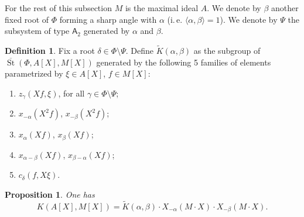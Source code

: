 \documentclass[10pt,a4paper,twoside]{article}
\newtheorem{prop}[lemma]{Proposition}
\theoremstyle{remark}
\theoremstyle{definition}
\numberwithin{lemma}{section}
\numberwithin{prop}{section}
\numberwithin{corollary}{section}
\numberwithin{externaltheorem}{section}
\newtheorem{df}[lemma]{Definition} \Crefname{df}{Definition}{Definitions}
\DeclareMathOperator{\St}{St}
\newcommand{\rA}{\mathsf{A}}
\numberwithin{equation}{section}
\begin{document}
For the rest of this subsection $M$ is the maximal ideal $A$.
We denote by $\beta$ another fixed root of $\Phi$ forming a sharp angle with $\alpha$ (i.\,e. $\langle \alpha, \beta \rangle = 1$). We denote by $\Psi$ the subsystem of type $\rA_2$ generated by $\alpha$ and $\beta$.
\begin{df}\label{def:Kab} 
Fix a root $\delta \in \Phi \setminus \Psi$. Define $\widetilde{K}(\alpha, \beta)$ as the subgroup of $\overline{\St}(\Phi, A[X], M[X])$ generated by the following 5 families of elements parametrized by $\xi \in A[X]$, $f\in M[X]$:
 \begin{enumerate}[label=(K\arabic*)]
  \item $z_\gamma(Xf, \xi)$, for all $\gamma \in \Phi \setminus \Psi$;
  \item $x_{-\alpha}(X^2f)$, $x_{-\beta}(X^2f)$;
  \item $x_{\alpha}(Xf)$, $x_\beta(Xf)$;
  \item $x_{\alpha-\beta}(Xf)$, $x_{\beta-\alpha}(Xf)$;
  \item $c_{\delta}(f, X\xi)$. \end{enumerate} \end{df}
\begin{prop} \label{K-a-b} One has \[K(A[X], M[X]) = \widetilde{K}(\alpha, \beta) \cdot X_{-\alpha}(M \cdot X) \cdot X_{-\beta}(M \cdot X).\] 
\end{prop} 
\end{document}
